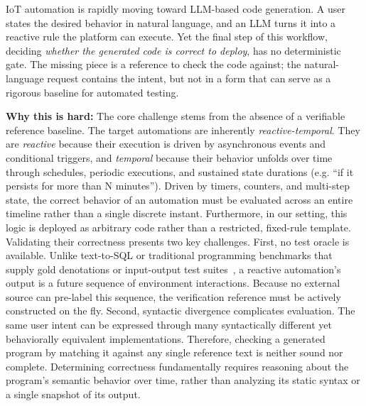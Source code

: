 \documentclass[sigconf,nonacm,anonymous,review]{acmart}
\begin{document}
IoT automation is rapidly moving toward LLM-based code generation. A user states the desired behavior in natural language, and an LLM turns it into a reactive rule the platform can execute. Yet the final step of this workflow, deciding \emph{whether the generated code is correct to deploy}, has no deterministic gate. The missing piece is a reference to check the code against; the natural-language request contains the intent, but not in a form that can serve as a rigorous baseline for automated testing.

\textbf{Why this is hard:} The core challenge stems from the absence of a verifiable reference baseline. The target automations are inherently \emph{reactive-temporal}. They are \emph{reactive} because their execution is driven by asynchronous events and conditional triggers,
and \emph{temporal} because their behavior unfolds over time through schedules, periodic executions, and sustained state durations (e.g. ``if it persists for more than N minutes'').
Driven by timers, counters, and multi-step state, the correct behavior of an automation must be evaluated across an entire timeline rather than a single discrete instant. Furthermore, in our setting, this logic is deployed as arbitrary code rather than a restricted, fixed-rule template.
Validating their correctness presents two key challenges. First, no test oracle is available. 
Unlike text-to-SQL or traditional programming benchmarks that supply gold denotations or input-output test suites~\cite{spider,humaneval}, a reactive automation's output is a future sequence of environment interactions. Because no external source can pre-label this sequence, the verification reference must be actively constructed on the fly. 
Second, syntactic divergence complicates evaluation. The same user intent can be expressed through many syntactically different yet behaviorally equivalent implementations. Therefore, checking a generated program by matching it against any single reference text is neither sound nor complete. Determining correctness fundamentally requires reasoning about the program’s semantic behavior over time, rather than analyzing its static syntax or a single snapshot of its output.
\end{document}
